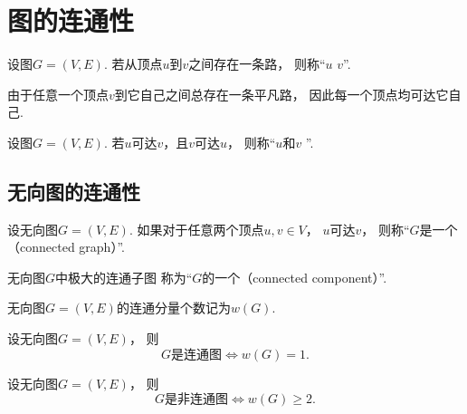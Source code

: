 \section{图的连通性}
\begin{definition}
设图\(G = (V,E)\).
若从顶点\(u\)到\(v\)之间存在一条路，
则称“\(u\)  \(v\)”.
\end{definition}

由于任意一个顶点\(v\)到它自己之间总存在一条平凡路，
因此每一个顶点均可达它自己.

\begin{definition}
设图\(G = (V,E)\).
若\(u\)可达\(v\)，且\(v\)可达\(u\)，
则称“\(u\)和\(v\) ”.
\end{definition}

\subsection{无向图的连通性}
\begin{definition}
设无向图\(G = (V,E)\).
如果对于任意两个顶点\(u,v \in V\)，
\(u\)可达\(v\)，
则称“\(G\)是一个（connected graph）”.
\end{definition}

\begin{definition}
无向图\(G\)中极大的连通子图
称为“\(G\)的一个（connected component）”.
\end{definition}

\begin{definition}
无向图\(G = (V,E)\)的连通分量个数记为\(w(G)\).
\end{definition}

\begin{theorem}
设无向图\(G = (V,E)\)，
则\begin{equation*}
	\text{$G$是连通图}
	\iff
	w(G) = 1.
\end{equation*}
\end{theorem}

\begin{corollary}
设无向图\(G = (V,E)\)，
则\begin{equation*}
	\text{$G$是非连通图}
	\iff
	w(G) \geq 2.
\end{equation*}
\end{corollary}

